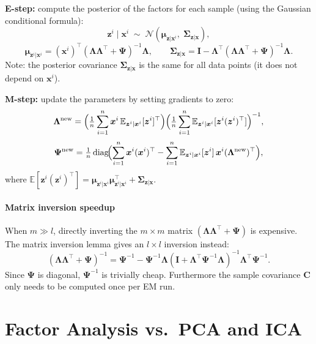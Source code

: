 \documentclass[11pt, oneside]{book}
\newcommand{\E}{\mathbb{E}}
\newcommand{\T}{^{\top}}
\begin{document}
\begin{thmbox}[title={FA EM Algorithm}]
\textbf{E-step:} compute the posterior of the factors for each sample (using the
Gaussian conditional formula):
\[
  \bm{z}^i \mid \bm{x}^i \;\sim\; \mathcal{N}(\bm{\mu}_{\bm{z}|{\bm{x}^i}},\;\bm{\Sigma}_{\bm{z}|\bm{x}}),
\]
\[
  \bm{\mu}_{\bm{z}^i|\bm{x}^i} = (\bm{x}^i)\T (\bm{\Lambda}\bm{\Lambda}\T+\bm{\Psi})^{-1}\bm{\Lambda},
  \qquad
  \bm{\Sigma}_{\bm{z}|\bm{x}} = \bm{I} - \bm{\Lambda}\T(\bm{\Lambda}\bm{\Lambda}\T+\bm{\Psi})^{-1}\bm{\Lambda}.
\]
Note: the posterior covariance $\bm{\Sigma}_{\bm{z}|\bm{x}}$ is the same for all
data points (it does not depend on $\bm{x}^i$).

\textbf{M-step:} update the parameters by setting gradients to zero:
\[
  \bm{\Lambda}^{\mathrm{new}} =
    \Bigl(\tfrac{1}{n}\sum_{i=1}^n \bm{x}^i\,\E_{\bm{z}^i|\bm{x}^i}[\bm{z}^i]\T\Bigr)
    \Bigl(\tfrac{1}{n}\sum_{i=1}^n \E_{\bm{z}^i|\bm{x}^i}[\bm{z}^i(\bm{z}^i)\T]\Bigr)^{-1},
\]
\[
  \bm{\Psi}^{\mathrm{new}} = \tfrac{1}{n}\,\mathrm{diag}\!\Bigl(
    \sum_{i=1}^n \bm{x}^i(\bm{x}^i)\T
    - \sum_{i=1}^n \E_{\bm{z}^i|\bm{x}^i}[\bm{z}^i]\,\bm{x}^i (\bm{\Lambda}^{\mathrm{new}})\T
  \Bigr),
\]
where $\E[\bm{z}^i(\bm{z}^i)\T] = \bm{\mu}_{\bm{z}^i|\bm{x}^i}\bm{\mu}_{\bm{z}^i|\bm{x}^i}\T + \bm{\Sigma}_{\bm{z}|\bm{x}}$.
\end{thmbox}

\paragraph{Matrix inversion speedup}
When $m \gg l$, directly inverting the $m\times m$ matrix
$(\bm{\Lambda}\bm{\Lambda}\T + \bm{\Psi})$ is expensive.
The matrix inversion lemma gives an $l\times l$ inversion instead:
\[
  (\bm{\Lambda}\bm{\Lambda}\T + \bm{\Psi})^{-1}
  = \bm{\Psi}^{-1} - \bm{\Psi}^{-1}\bm{\Lambda}
    (\bm{I} + \bm{\Lambda}\T\bm{\Psi}^{-1}\bm{\Lambda})^{-1}
    \bm{\Lambda}\T\bm{\Psi}^{-1}.
\]
Since $\bm{\Psi}$ is diagonal, $\bm{\Psi}^{-1}$ is trivially cheap.
Furthermore the sample covariance $\bm{C}$ only needs to be computed once per
EM run.


\section{Factor Analysis vs.\ PCA and ICA}
\end{document}
